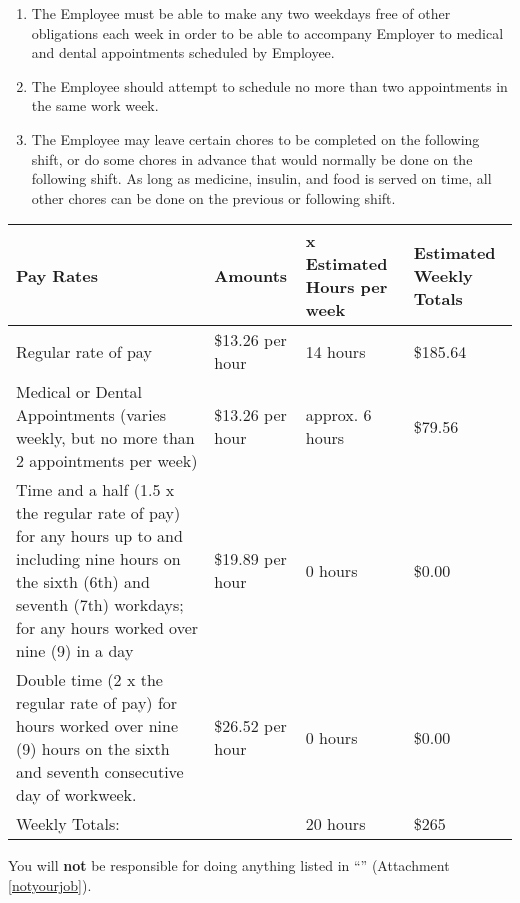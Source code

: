 \documentclass[]{article}
\begin{document}
\begin{enumerate}
\begin{enumerate}
				\begin{enumerate}
					\item The Employee must be able to make any two weekdays free of other obligations each week in order to be able to accompany Employer to medical and dental appointments scheduled by Employee.
					\item The Employee should attempt to schedule no more than two appointments in the same work week.
					\item The Employee may leave certain chores to be completed on the following shift, or do some chores in advance that would normally be done on the following shift. As long as medicine, insulin, and food is served on time, all other chores can be done on the previous or following shift.
				\end{enumerate}
		\end{enumerate}
		\begin{tabular}{|p{}|l|l|p{}|}
			\hline
			Pay Rates & Amounts & x Estimated Hours per week & Estimated Weekly Totals\\ \hline
			Regular rate of pay & \$13.26 per hour & 14 hours & \$185.64\\ \hline
			Medical or Dental Appointments (varies weekly, but no more than 2 appointments per week) & \$13.26 per hour & approx. 6 hours & \$79.56\\ \hline
			Time and a half (1.5 x the regular rate of pay) for any hours up to and including nine hours on the sixth (6th) and seventh (7th) workdays; for any hours worked over nine (9) in a day & \$19.89 per hour & 0 hours & \$0.00\\ \hline
			Double time (2 x the regular rate of pay) for hours worked over nine (9) hours on the sixth and seventh consecutive day of workweek. & \$26.52 per hour & 0 hours & \$0.00\\ \hline
			Weekly Totals: & & 20 hours & \$265\\
			\hline
		\end{tabular}
\end{enumerate}

You will \textbf{not} be responsible for doing anything listed in ``\notyourjob{}'' (Attachment \ref{notyourjob}). 
\end{document}
